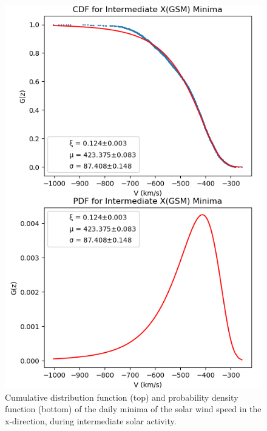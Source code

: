 \documentclass[12pt]{article}
\begin{document}
        \begin{figure}[t!]
            \begin{minipage}{0.48\textwidth}
                \centering
                \includegraphics[width=\textwidth]{fig_method/SWEintXmin.png}
                \caption{Cumulative distribution function (top) and probability density function (bottom) of the daily minima of the solar wind speed in the x-direction, during intermediate solar activity.}
                \label{fig:SWEintXmin}
            \end{minipage}
            \hfill
            \begin{minipage}{0.48\textwidth}
                \centering

\end{minipage}
\end{figure}
\end{document}
